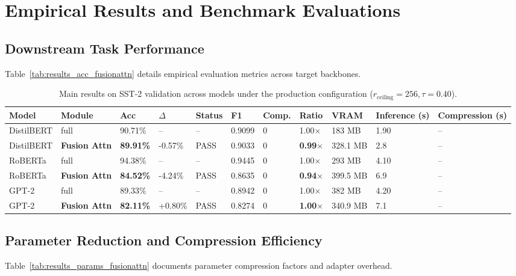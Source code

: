 \section{Empirical Results and Benchmark Evaluations}

\subsection{Downstream Task Performance}
Table~\ref{tab:results_acc_fusionattn} details empirical evaluation metrics across target backbones.

\begin{table}[t]
\centering
\small
\begin{tabular}{lllllllllll}
\toprule
\textbf{Model} & \textbf{Module} & \textbf{Acc} & \textbf{$\Delta$} & \textbf{Status} & \textbf{F1} & \textbf{Comp.} & \textbf{Ratio} & \textbf{VRAM} & \textbf{Inference (s)} & \textbf{Compression (s)} \\
\midrule
DistilBERT & full & 90.71\% & -- & -- & 0.9099 & 0 & 1.00$\times$ & 183 MB & 1.90 & -- \\
DistilBERT & \textbf{Fusion Attn} & \textbf{89.91\%} & -0.57\% & PASS & 0.9033 & 0 & \textbf{0.99$\times$} & 328.1 MB & 2.8 & -- \\
RoBERTa & full & 94.38\% & -- & -- & 0.9445 & 0 & 1.00$\times$ & 293 MB & 4.10 & -- \\
RoBERTa & \textbf{Fusion Attn} & \textbf{84.52\%} & -4.24\% & PASS & 0.8635 & 0 & \textbf{0.94$\times$} & 399.5 MB & 6.9 & -- \\
GPT-2 & full & 89.33\% & -- & -- & 0.8942 & 0 & 1.00$\times$ & 382 MB & 4.20 & -- \\
GPT-2 & \textbf{Fusion Attn} & \textbf{82.11\%} & +0.80\% & PASS & 0.8274 & 0 & \textbf{1.00$\times$} & 340.9 MB & 7.1 & -- \\
\bottomrule
\end{tabular}
\caption{Main results on SST-2 validation across models under the production configuration ($r_{\mathrm{ceiling}}=256, \tau=0.40$).}
\label{tab:main_sst2}
\end{table}

\subsection{Parameter Reduction and Compression Efficiency}
Table~\ref{tab:results_params_fusionattn} documents parameter compression factors and adapter overhead.

